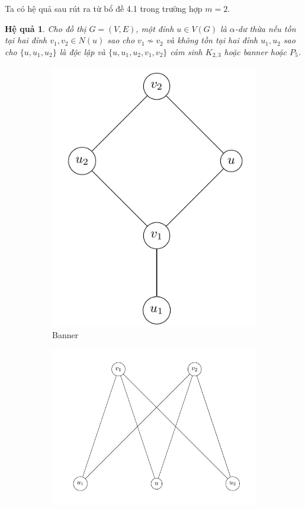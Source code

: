 \documentclass[14pt, oneside, a4paper, openany]{scrartcl}
\newtheorem{corollary}{Hệ quả}[theorem]
\begin{document}
Ta có hệ quả sau rút ra từ bổ đề 4.1 trong trường hợp $m=2$.
\begin{corollary}
	Cho đồ thị $G = (V,E)$, một đỉnh $u \in V(G)$ là $\alpha$-dư thừa nếu tồn tại hai đỉnh $v_1, v_2 \in N(u)$ sao cho $v_1 \nsim v_2$ và không tồn tại hai đỉnh $u_1, u_2$ sao cho $\{u,u_1,u_2\}$ là độc lập và $\{u,u_1,u_2,v_1,v_2\}$ cảm sinh $K_{2,3}$ hoặc banner hoặc $P_5$.
\end{corollary}
%
\begin{figure}[!h]
	\centering
	\begin{subfigure}{.3\textwidth}
		\centering
		\includegraphics[scale=0.35]{figures/banner2.png}
		\caption{Banner}
		\label{fig:sub1}
	\end{subfigure}%
	\begin{subfigure}{.3\textwidth}
		\centering
		\includegraphics[scale=0.35]{figures/k23.png}

\end{subfigure}
\end{figure}
\end{document}

